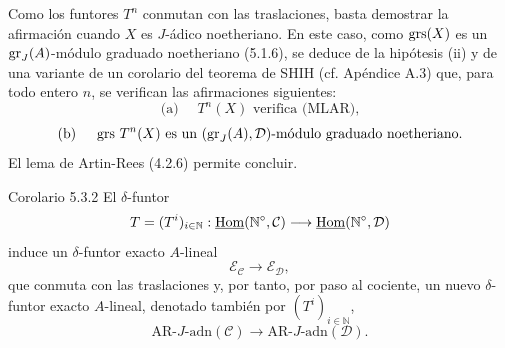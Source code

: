 \begin{prooftext}[Demostración]
Como los funtores \(T^n\) conmutan con las traslaciones, basta demostrar la afirmación cuando \(X\) es \(J\)-ádico noetheriano. En este caso, como \(\operatorname{grs}(X)\) es un \(\operatorname{gr}_J(A)\)-módulo graduado noetheriano (5.1.6), se deduce de la hipótesis (ii) y de una variante de un corolario del teorema de SHIH (cf. Apéndice A.3) que, para todo entero \(n\), se verifican las afirmaciones siguientes:
\[
\text{(a) }\quad T^n(X)\text{ verifica (MLAR),}
\]
\[
\text{(b) }\quad \operatorname{grs}\,T^n(X)\text{ es un }(\operatorname{gr}_J(A),\mathcal D)\text{-módulo graduado noetheriano.}
\]
El lema de Artin-Rees (4.2.6) permite concluir.
\end{prooftext}

\begin{statement}{Corolario 5.3.2}
El \(\delta\)-funtor
\[
T=(T^i)_{i\in\mathbb N}:\underline{\operatorname{Hom}}(\mathbb N^\circ,\mathcal C)\longrightarrow\underline{\operatorname{Hom}}(\mathbb N^\circ,\mathcal D)
\]
induce un \(\delta\)-funtor exacto \(A\)-lineal
\[
\mathcal E_{\mathcal C}\longrightarrow\mathcal E_{\mathcal D},
\]
que conmuta con las traslaciones y, por tanto, por paso al cociente, un nuevo \(\delta\)-funtor exacto \(A\)-lineal, denotado también por \((T^i)_{i\in\mathbb N}\),
\[
\mathrm{AR}\text{-}J\text{-adn}(\mathcal C)\longrightarrow
\mathrm{AR}\text{-}J\text{-adn}(\mathcal D).
\]
\end{statement}
